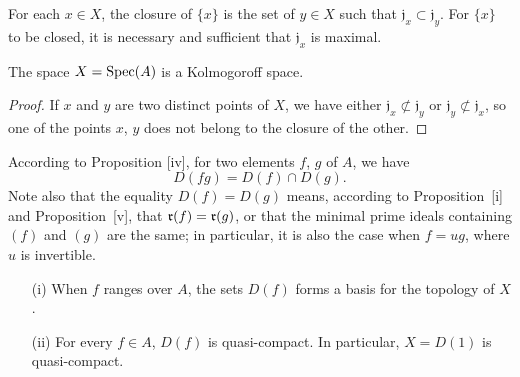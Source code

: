 \begin{corollary}[1.1.7]
\label{I.1.1.7}
For each $x\in X$, the closure of $\{x\}$ is the set of $y\in X$ such that $\mathfrak{j}_x\subset\mathfrak{j}_y$.
For $\{x\}$ to be closed, it is necessary and sufficient that $\mathfrak{j}_x$ is maximal.
\end{corollary}

\begin{corollary}[1.1.8]
\label{I.1.1.8}
The space $X=\operatorname{Spec}(A)$ is a Kolmogoroff space.
\end{corollary}

\begin{proof}
If $x$ and $y$ are two distinct points of $X$, we have either $\mathfrak{j}_x\not\subset\mathfrak{j}_y$ or $\mathfrak{j}_y\not\subset\mathfrak{j}_x$, so one of the points $x$, $y$ does not belong to the closure of the other.
\end{proof}

\begin{env}[1.1.9]
\label{I.1.1.9}
According to Proposition [iv], for two elements $f$, $g$ of $A$, we have
\[
  D(fg)=D(f)\cap D(g).
  \tag{1.1.9.1}
\]
Note also that the equality $D(f)=D(g)$ means, according to Proposition~[i] and Proposition~[v], that $\mathfrak{r}(f)=\mathfrak{r}(g)$, or that the minimal prime ideals containing $(f)$ and $(g)$ are the same;
in particular, it is also the case when $f=ug$, where $u$ is invertible.
\end{env}

\begin{proposition}[1.1.10]
\label{I.1.1.10}
\medskip\noindent
{}
\begin{enumerate}
  \item[{\rm(i)}] When $f$ ranges over $A$, the sets $D(f)$ forms a basis for the topology of $X$.
  \item[{\rm(ii)}] For every $f\in A$, $D(f)$ is quasi-compact.
    In particular, $X=D(1)$ is quasi-compact.
\end{enumerate}
\end{proposition}

